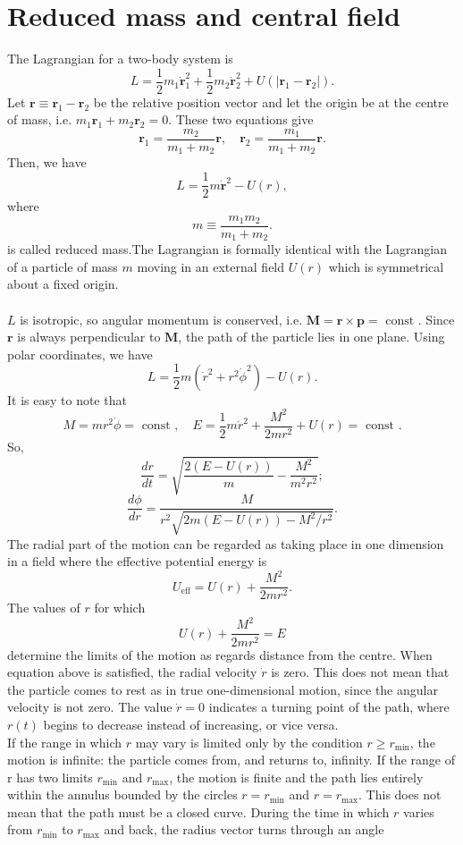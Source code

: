 \section{Reduced mass and central field}
The Lagrangian for a two-body system is
\[L = \frac{1}{2} m_1 \dot{\bm{r}}_1^2 + \frac{1}{2} m_2 \dot{\bm{r}}_2^2 + U(|\bm{r}_1 - \bm{r}_2|).\]
Let $\bm{r} \equiv \bm{r}_1 -\bm{r}_2 $ be the relative position vector and let the origin be at the centre of mass, i.e. $m_1\bm{r}_1 + m_2\bm{r}_2 = 0$. These two equations give
\[\bm{r}_1 = \frac{m_2}{m_1+m_2}\bm{r} ,\quad \bm{r}_2 = \frac{m_1}{m_1+m_2}\bm{r}.\]
Then, we have
\[L = \frac{1}{2} m \dot{\bm{r}}^2 - U(r),\]
where
\[m \equiv \frac{m_1m_2}{m_1+m_2}.\]
is called reduced mass.The Lagrangian is formally identical with the Lagrangian of a particle of mass $m$ moving in an external field $U(r)$ which is symmetrical about a fixed origin. 
\\ \\
$L$ is isotropic, so angular momentum is conserved, i.e. $\bm{M} = \bm{r} \times \bm{p} = \mbox{ const }$. Since $\bm{r}$ is always perpendicular to $\bm{M}$, the path of the particle lies in one plane. Using polar coordinates, we have
\[L = \frac{1}{2}m(\dot{r}^2 + r^2 \dot{\phi}^2)-U(r).\]
It is easy to note that
\[M = mr^2\dot{\phi} = \mbox{ const }, \quad E = \frac{1}{2}m \dot{r}^2 + \frac{M^2}{2mr^2} + U(r) = \mbox{ const }.\]
So,
\[\frac{dr}{dt} = \sqrt{\frac{2(E-U(r))}{m} - \frac{M^2}{m^2r^2}};\]
\[\frac{d\phi}{dr} = \frac{M}{r^2 \sqrt{2m(E-U(r))-M^2/r^2}}.\]
The radial part of the motion can be regarded as taking place in one dimension in a field where the effective potential energy is
\[U_{\mathrm{eff}} = U(r) + \frac{M^2}{2mr^2}.\]
The values of $r$ for which
\[U(r) + \frac{M^2}{2mr^2} = E \]
determine the limits of the motion as regards distance from the centre. When equation above is satisfied, the radial velocity $\dot{r}$ is zero. This does not mean that the particle comes to rest as in true one-dimensional motion, since the angular velocity is not zero. The value $\dot{r} = 0$ indicates a turning point of the path, where $r(t)$ begins to decrease instead of increasing, or vice versa.
\\ 
If the range in which $r$ may vary is limited only by the condition $r \ge r_{\mathrm{min}}$, the motion is infinite: the particle comes from, and returns to, infinity.
If the range of r has two limits $r_{\mathrm{min}}$ and $r_{\mathrm{max}}$, the motion is finite and the path lies entirely within the annulus bounded by the circles $r = r_{\mathrm{min}}$ and $r = r_{\mathrm{max}}$. This does not mean that the path must be a closed curve. During the time in which $r$ varies from $r_{\mathrm{min}}$ to $r_{\mathrm{max}}$ and back, the radius vector turns through an angle
